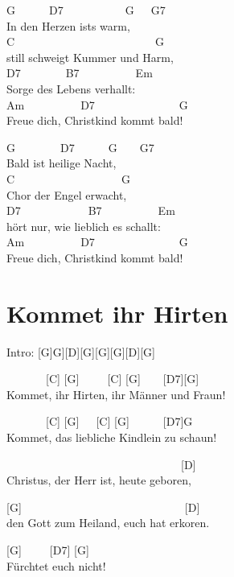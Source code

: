 \documentclass[
  letterpaper,
  twoside=false]{scrbook}
\begin{document}
G~~~~~~D7~~~~~~~~~~~G~~~G7\\
In den Herzen ist\textquotesingle s warm,\\
C~~~~~~~~~~~~~~~~~~~~~~~~~G\\
still schweigt Kummer und Harm,\\
D7~~~~~~~~B7~~~~~~~~~~Em\\
Sorge des Lebens verhallt:\\
Am~~~~~~~~~~D7~~~~~~~~~~~~~~~G\\
Freue dich, Christkind kommt bald!

G~~~~~~~~D7~~~~~~G~~~~G7\\
Bald ist heilige Nacht,\\
C~~~~~~~~~~~~~~~~~~~G\\
Chor der Engel erwacht,\\
D7~~~~~~~~~~~~B7~~~~~~~~~~Em\\
hört nur, wie lieblich es schallt:\\
Am~~~~~~~~~~D7~~~~~~~~~~~~~~~G\\
Freue dich, Christkind kommt bald!

\hypertarget{kommet-ihr-hirten}{%
\chapter{Kommet ihr Hirten}\label{kommet-ihr-hirten}}

Intro: {[}G{]}G{]}{[}D{]}{[}G{]}{[}G{]}{[}G{]}{[}D{]}{[}G{]}

~~~~~~~{[}C{]} {[}G{]}~~~~~{[}C{]} {[}G{]}~~~~{[}D7{]}{[}G{]}\\
Kommet, ihr Hirten, ihr Männer und Fraun!

~~~~~~~{[}C{]} {[}G{]}~~~{[}C{]} {[}G{]}~~~~~~{[}D7{]}G\\
Kommet, das liebliche Kindlein zu schaun!

~~~~~~~~~~~~~~~~~~~~~~~~~~~~~~~{[}D{]}\\
Christus, der Herr ist, heute geboren,

{[}G{]}~~~~~~~~~~~~~~~~~~~~~~~~~~~~~{[}D{]}\\
den Gott zum Heiland, euch hat erkoren.

{[}G{]}~~~~~{[}D7{]} {[}G{]}\\
Fürchtet euch nicht!
\end{document}
